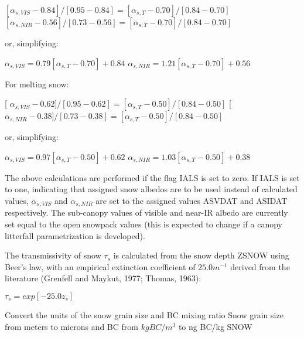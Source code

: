$[\alpha_{s,VIS} - 0.84]/[0.95-0.84] = [\alpha_{s,T} - 0.70]/[0.84-0.70]$ $[\alpha_{s,NIR} - 0.56]/[0.73-0.56] = [\alpha_{s,T} - 0.70]/[0.84-0.70]$

or, simplifying\+:

$\alpha_{s,VIS} = 0.79[\alpha_{s,T} - 0.70] + 0.84$ $\alpha_{s,NIR} = 1.21[\alpha_{s,T} - 0.70] + 0.56$

For melting snow\+:

\mbox{[} $\alpha_{s,VIS} - 0.62]/[0.95-0.62] = [\alpha_{s,T} - 0.50]/[0.84-0.50]$ \mbox{[} $\alpha_{s,NIR} - 0.38]/[0.73-0.38] = [\alpha_{s,T} - 0.50]/[0.84-0.50]$

or, simplifying\+:

$\alpha_{s,VIS} = 0.97[\alpha_{s,T} - 0.50] + 0.62$ $\alpha_{s,NIR} = 1.03[\alpha_{s,T} - 0.50] + 0.38$

The above calculations are performed if the flag I\+A\+L\+S is set to zero. If I\+A\+L\+S is set to one, indicating that assigned snow albedos are to be used instead of calculated values, $\alpha_{s,VIS}$ and $\alpha_{s,NIR}$ are set to the assigned values A\+S\+V\+D\+A\+T and A\+S\+I\+D\+A\+T respectively. The sub-\/canopy values of visible and near-\/\+I\+R albedo are currently set equal to the open snowpack values (this is expected to change if a canopy litterfall parametrization is developed).

The transmissivity of snow $\tau_s$ is calculated from the snow depth Z\+S\+N\+O\+W using Beer’s law, with an empirical extinction coefficient of $25.0 m^{-1}$ derived from the literature (Grenfell and Maykut, 1977; Thomas, 1963)\+:

$\tau_s = exp[-25.0 z_s]$

Convert the units of the snow grain size and B\+C mixing ratio Snow grain size from meters to microns and B\+C from $kg BC/m^3$ to ng B\+C/kg S\+N\+O\+W